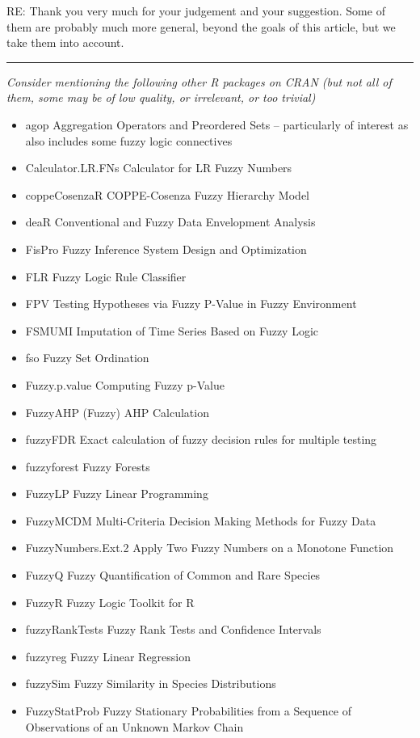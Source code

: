 \documentclass{article}
\newcommand{\separator}{\rule{\textwidth}{0.4pt}}
\begin{document}
{RE: Thank you very much for your judgement and your suggestion. Some of them are probably much more general, beyond the goals of this article, but we take them into account.}

\separator

{\it Consider mentioning the following other R packages on CRAN (but not all of them, some may be of low quality, or irrelevant, or too trivial)
\begin{itemize}
    \item agop Aggregation Operators and Preordered Sets -- particularly of interest as also includes some fuzzy logic connectives
    \item Calculator.LR.FNs Calculator for LR Fuzzy Numbers
    \item coppeCosenzaR COPPE-Cosenza Fuzzy Hierarchy Model
    \item deaR Conventional and Fuzzy Data Envelopment Analysis
    \item FisPro Fuzzy Inference System Design and Optimization
    \item FLR Fuzzy Logic Rule Classifier
    \item FPV Testing Hypotheses via Fuzzy P-Value in Fuzzy Environment
    \item FSMUMI Imputation of Time Series Based on Fuzzy Logic
    \item fso Fuzzy Set Ordination
    \item Fuzzy.p.value Computing Fuzzy p-Value
    \item FuzzyAHP (Fuzzy) AHP Calculation
    \item fuzzyFDR Exact calculation of fuzzy decision rules for multiple testing
    \item fuzzyforest Fuzzy Forests
    \item FuzzyLP Fuzzy Linear Programming
    \item FuzzyMCDM Multi-Criteria Decision Making Methods for Fuzzy Data
    \item FuzzyNumbers.Ext.2 Apply Two Fuzzy Numbers on a Monotone Function
    \item FuzzyQ Fuzzy Quantification of Common and Rare Species
    \item FuzzyR Fuzzy Logic Toolkit for R
    \item fuzzyRankTests Fuzzy Rank Tests and Confidence Intervals
    \item fuzzyreg Fuzzy Linear Regression
    \item fuzzySim Fuzzy Similarity in Species Distributions
    \item FuzzyStatProb Fuzzy Stationary Probabilities from a Sequence of Observations of an Unknown Markov Chain

\end{itemize}}
\end{document}
